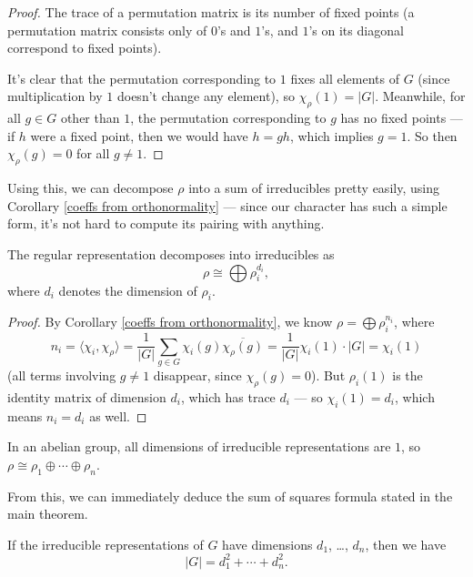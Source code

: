 \begin{proof}
    The trace of a permutation matrix is its number of fixed points (a permutation matrix consists only of $0$'s and $1$'s, and $1$'s on its diagonal correspond to fixed points). 
    
    It's clear that the permutation corresponding to $1$ fixes all elements of $G$ (since multiplication by $1$ doesn't change any element), so $\chi_\rho(1) = \lvert G \rvert$. Meanwhile, for all $g \in G$ other than $1$, the permutation corresponding to $g$ has no fixed points --- if $h$ were a fixed point, then we would have $h = gh$, which implies $g = 1$. So then $\chi_\rho(g) = 0$ for all $g \neq 1$. 
\end{proof}

Using this, we can decompose $\rho$ into a sum of irreducibles pretty easily, using Corollary \ref{coeffs from orthonormality} --- since our character has such a simple form, it's not hard to compute its pairing with anything. 

\begin{proposition} \label{decomposition of regular rep}
    The regular representation decomposes into irreducibles as \[\rho \cong \bigoplus \rho_i^{d_i},\] where $d_i$ denotes the dimension of $\rho_i$. 
\end{proposition}

\begin{proof}
    By Corollary \ref{coeffs from orthonormality}, we know $\rho = \bigoplus \rho_i^{n_i}$, where \[n_i = \langle \chi_i, \chi_\rho \rangle = \frac{1}{|G|}\sum_{g \in G} \chi_i(g)\overline{\chi_\rho(g)} = \frac{1}{|G|}\chi_i(1)\cdot |G| = \chi_i(1)\] (all terms involving $g \neq 1$ disappear, since $\chi_\rho(g) = 0$). But $\rho_i(1)$ is the identity matrix of dimension $d_i$, which has trace $d_i$ --- so $\chi_i(1) = d_i$, which means $n_i = d_i$ as well. 
\end{proof}

\begin{example}
In an abelian group, all dimensions of irreducible representations are $1$, so $\rho \cong \rho_1 \oplus \cdots \oplus \rho_n$.
\end{example}

From this, we can immediately deduce the sum of squares formula stated in the main theorem.  

\begin{proposition}
    If the irreducible representations of $G$ have dimensions $d_1$, \ldots, $d_n$, then we have \[\lvert G \rvert = d_1^2 + \cdots + d_n^2.\] 
\end{proposition}

